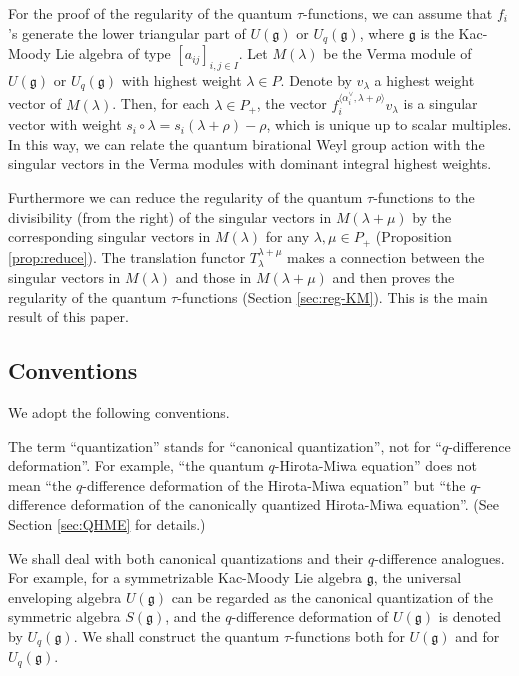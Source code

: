 \documentclass[12pt,twoside]{article}
\newcommand\bra{\langle}
\newcommand\ket{\rangle}
\newcommand\av{\alpha^\vee}
\newcommand\g{{\mathfrak g}}
\theoremstyle{plain} %
\theoremstyle{definition} %
\theoremstyle{definition} %
\numberwithin{theorem}{section}
\numberwithin{equation}{section}
\numberwithin{figure}{section}
\numberwithin{table}{section}
\newcommand\secref[1]{Section \ref{#1}}
\newcommand\propref[1]{Proposition \ref{#1}}
\begin{document}
For the proof of the regularity of the quantum $\tau$-functions, 
we can assume that $f_i$'s generate the lower triangular part of $U(\g)$ or $U_q(\g)$,
where $\g$ is the Kac-Moody Lie algebra of type $[a_{ij}]_{i,j\in I}$.
Let $M(\lambda)$ be the Verma module of $U(\g)$ or $U_q(\g)$ 
with highest weight $\lambda\in P$.
Denote by $v_\lambda$ a highest weight vector of $M(\lambda)$.
Then, for each $\lambda\in P_+$, the vector $f_i^{\bra\av_i,\lambda+\rho\ket}v_\lambda$ 
is a singular vector with weight $s_i\circ\lambda=s_i(\lambda+\rho)-\rho$,
which is unique up to scalar multiples.
In this way, we can relate the quantum birational Weyl group action 
with the singular vectors in the Verma modules with dominant integral
highest weights.

Furthermore we can reduce the regularity of the quantum 
$\tau$-functions to the divisibility (from the right) of the singular vectors
in $M(\lambda+\mu)$ by the corresponding singular vectors in $M(\lambda)$ 
for any $\lambda,\mu\in P_+$ (\propref{prop:reduce}).
The translation functor $T_\lambda^{\lambda+\mu}$ makes a connection between 
the singular vectors in $M(\lambda)$ and those in $M(\lambda+\mu)$
and then proves the regularity of the quantum $\tau$-functions 
(\secref{sec:reg-KM}).  This is the main result of this paper.


\subsection{Conventions}

We adopt the following conventions.

The term ``quantization'' stands for ``canonical quantization'',
not for ``$q$-difference deformation''.
For example, ``the quantum $q$-Hirota-Miwa equation''
does not mean ``the $q$-difference deformation of the Hirota-Miwa equation''
but ``the $q$-difference deformation of the canonically quantized Hirota-Miwa equation''. 
(See \secref{sec:QHME} for details.)

We shall deal with both canonical quantizations and their $q$-difference analogues. 
For example, for a symmetrizable Kac-Moody Lie algebra $\g$, 
the universal enveloping algebra $U(\g)$ can be regarded as 
the canonical quantization of the symmetric algebra $S(\g)$,
and the $q$-difference deformation of $U(\g)$ is denoted by $U_q(\g)$.
We shall construct the quantum $\tau$-functions both for $U(\g)$ and for $U_q(\g)$.
\end{document}
